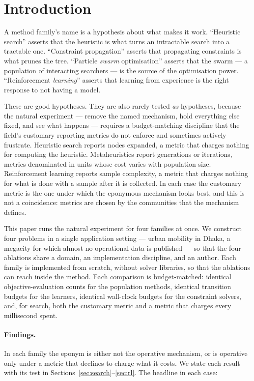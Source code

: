 \documentclass[11pt]{article}
\begin{document}
\section{Introduction}

A method family's name is a hypothesis about what makes it work. ``Heuristic search'' asserts that
the heuristic is what turns an intractable search into a tractable one. ``Constraint propagation''
asserts that propagating constraints is what prunes the tree. ``Particle \emph{swarm}
optimisation'' asserts that the swarm --- a population of interacting searchers --- is the source
of the optimisation power. ``Reinforcement \emph{learning}'' asserts that learning from experience
is the right response to not having a model.

These are good hypotheses. They are also rarely tested \emph{as} hypotheses, because the natural
experiment --- remove the named mechanism, hold everything else fixed, and see what happens ---
requires a budget-matching discipline that the field's customary reporting metrics do not enforce
and sometimes actively frustrate. Heuristic search reports nodes expanded, a metric that charges
nothing for computing the heuristic. Metaheuristics report generations or iterations, metrics
denominated in units whose cost varies with population size. Reinforcement learning reports
sample complexity, a metric that charges nothing for what is done with a sample after it is
collected. In each case the customary metric is the one under which the eponymous mechanism looks
best, and this is not a coincidence: metrics are chosen by the communities that the mechanism
defines.

This paper runs the natural experiment for four families at once. We construct four problems in a
single application setting --- urban mobility in Dhaka, a megacity for which almost no operational
data is published --- so that the four ablations share a domain, an implementation discipline, and
an author. Each family is implemented from scratch, without solver libraries, so that the ablations
can reach inside the method. Each comparison is budget-matched: identical objective-evaluation
counts for the population methods, identical transition budgets for the learners, identical
wall-clock budgets for the constraint solvers, and, for search, both the customary metric and a
metric that charges every millisecond spent.

\paragraph{Findings.} In each family the eponym is either not the operative mechanism, or is
operative only under a metric that declines to charge what it costs. We state each result with its
test in Sections~\ref{sec:search}--\ref{sec:rl}. The headline in each case:
\end{document}
